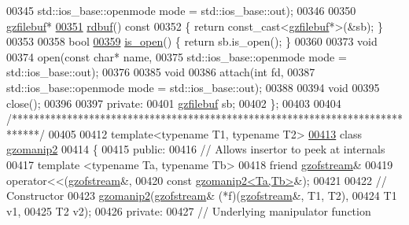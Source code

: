 \begin{DoxyCode}
00345              std::ios\_base::openmode mode = std::ios\_base::out);
00346 
00350   \hyperlink{classgzfilebuf}{gzfilebuf}*
\hyperlink{classgzofstream_a2fef74202b114357f41cfeb28f1d2acc}{00351}   \hyperlink{classgzofstream_a2fef74202b114357f41cfeb28f1d2acc}{rdbuf}()\textcolor{keyword}{ const}
00352 \textcolor{keyword}{  }\{ \textcolor{keywordflow}{return} \textcolor{keyword}{const\_cast<}\hyperlink{classgzfilebuf}{gzfilebuf}*\textcolor{keyword}{>}(&sb); \}
00353 
00358   \textcolor{keywordtype}{bool}
\hyperlink{classgzofstream_acb1c9c6dccaf41bc5e44c2263ea48de3}{00359}   \hyperlink{classgzofstream_acb1c9c6dccaf41bc5e44c2263ea48de3}{is\_open}() \{ \textcolor{keywordflow}{return} sb.is\_open(); \}
00360 
00373   \textcolor{keywordtype}{void}
00374   open(\textcolor{keyword}{const} \textcolor{keywordtype}{char}* name,
00375        std::ios\_base::openmode mode = std::ios\_base::out);
00376 
00385   \textcolor{keywordtype}{void}
00386   attach(\textcolor{keywordtype}{int} fd,
00387          std::ios\_base::openmode mode = std::ios\_base::out);
00388 
00394   \textcolor{keywordtype}{void}
00395   close();
00396 
00397 \textcolor{keyword}{private}:
00401   \hyperlink{classgzfilebuf}{gzfilebuf} sb;
00402 \};
00403 
00404 \textcolor{comment}{/*****************************************************************************/}
00405 
00412 \textcolor{keyword}{template}<\textcolor{keyword}{typename} T1, \textcolor{keyword}{typename} T2>
\hyperlink{classgzomanip2}{00413}   \textcolor{keyword}{class }\hyperlink{classgzomanip2}{gzomanip2}
00414   \{
00415   \textcolor{keyword}{public}:
00416     \textcolor{comment}{// Allows insertor to peek at internals}
00417     \textcolor{keyword}{template} <\textcolor{keyword}{typename} Ta, \textcolor{keyword}{typename} Tb>
00418       \textcolor{keyword}{friend} \hyperlink{classgzofstream}{gzofstream}&
00419       operator<<(\hyperlink{classgzofstream}{gzofstream}&,
00420                  \textcolor{keyword}{const} \hyperlink{classgzomanip2}{gzomanip2<Ta,Tb>}&);
00421 
00422     \textcolor{comment}{// Constructor}
00423     \hyperlink{classgzomanip2}{gzomanip2}(\hyperlink{classgzofstream}{gzofstream}& (*f)(\hyperlink{classgzofstream}{gzofstream}&, T1, T2),
00424               T1 v1,
00425               T2 v2);
00426   \textcolor{keyword}{private}:
00427     \textcolor{comment}{// Underlying manipulator function}

\end{DoxyCode}
